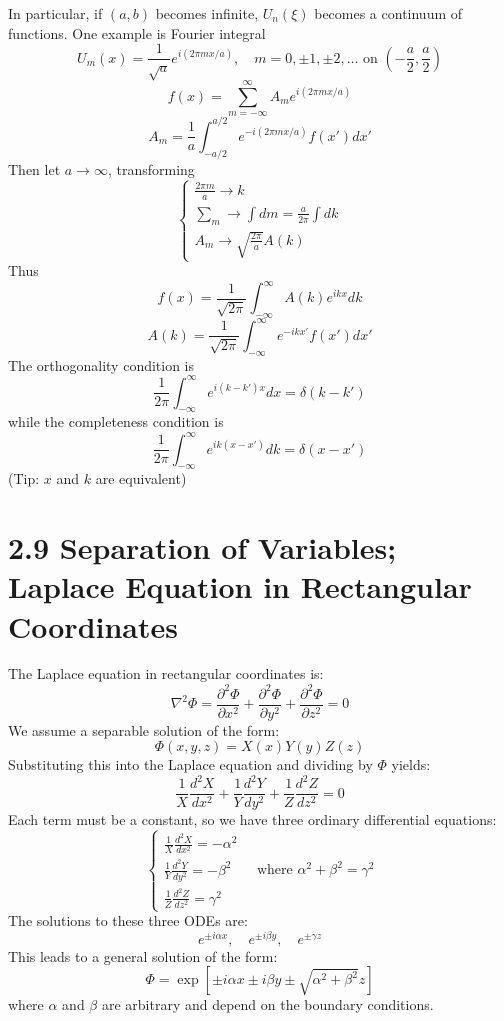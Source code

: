 \documentclass{article}
\begin{document}
	In particular, if $(a,b)$ becomes infinite, $U_n(\xi)$ becomes a continuum of functions.
	One example is Fourier integral
	$$
	U_m(x) = \frac{1}{\sqrt{a}} e^{i(2\pi mx/a)}, \quad m=0, \pm 1, \pm 2, \dots \text{ on } (-\frac{a}{2}, \frac{a}{2})
	$$
	$$
	f(x) = \sum_{m=-\infty}^{\infty} A_m e^{i(2\pi mx/a)}
	$$
	$$
	A_m = \frac{1}{a} \int_{-a/2}^{a/2} e^{-i(2\pi mx/a)} f(x') dx'
	$$
	Then let $a \to \infty$, transforming
	$$
	\begin{cases}
		\frac{2\pi m}{a} \to k \\
		\sum_m \to \int dm = \frac{a}{2\pi} \int dk \\
		A_m \to \sqrt{\frac{2\pi}{a}} A(k)
	\end{cases}
	$$
	Thus
	$$
	f(x) = \frac{1}{\sqrt{2\pi}} \int_{-\infty}^{\infty} A(k) e^{ikx} dk
	$$
	$$
	A(k) = \frac{1}{\sqrt{2\pi}} \int_{-\infty}^{\infty} e^{-ikx'} f(x') dx'
	$$
	The orthogonality condition is
	$$
	\frac{1}{2\pi} \int_{-\infty}^{\infty} e^{i(k-k')x} dx = \delta(k-k')
	$$
	while the completeness condition is
	$$
	\frac{1}{2\pi} \int_{-\infty}^{\infty} e^{ik(x-x')} dk = \delta(x-x')
	$$
	(Tip: $x$ and $k$ are equivalent)
	
	
	\section*{2.9 Separation of Variables; Laplace Equation in Rectangular Coordinates}
	
	The Laplace equation in rectangular coordinates is:
	\[
	\nabla^2 \Phi = \frac{\partial^2 \Phi}{\partial x^2} + \frac{\partial^2 \Phi}{\partial y^2} + \frac{\partial^2 \Phi}{\partial z^2} = 0
	\]
	We assume a separable solution of the form:
	\[
	\Phi(x,y,z) = X(x)Y(y)Z(z)
	\]
	Substituting this into the Laplace equation and dividing by \(\Phi\) yields:
	\[
	\frac{1}{X}\frac{d^2X}{dx^2} + \frac{1}{Y}\frac{d^2Y}{dy^2} + \frac{1}{Z}\frac{d^2Z}{dz^2} = 0
	\]
	Each term must be a constant, so we have three ordinary differential equations:
	\[
	\begin{cases}
		\frac{1}{X}\frac{d^2X}{dx^2} = -\alpha^2 \\
		\frac{1}{Y}\frac{d^2Y}{dy^2} = -\beta^2 \\
		\frac{1}{Z}\frac{d^2Z}{dz^2} = \gamma^2
	\end{cases}
	\quad \text{where } \alpha^2 + \beta^2 = \gamma^2
	\]
	The solutions to these three ODEs are:
	\[
	e^{\pm i \alpha x}, \quad e^{\pm i \beta y}, \quad e^{\pm \gamma z}
	\]
	This leads to a general solution of the form:
	\[
	\Phi = \exp[\pm i \alpha x \pm i \beta y \pm \sqrt{\alpha^2 + \beta^2} z]
	\]
	where \(\alpha\) and \(\beta\) are arbitrary and depend on the boundary conditions.
	
\end{document}
